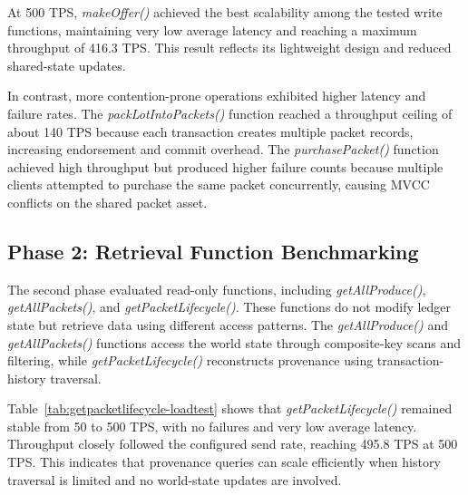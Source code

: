 \documentclass[manuscript,screen]{acmart}
\begin{document}
At 500 TPS, \textit{makeOffer()} achieved the best scalability among the tested write functions, maintaining very low average latency and reaching a maximum throughput of 416.3 TPS. This result reflects its lightweight design and reduced shared-state updates.

In contrast, more contention-prone operations exhibited higher latency and failure rates. The \textit{packLotIntoPackets()} function reached a throughput ceiling of about 140 TPS because each transaction creates multiple packet records, increasing endorsement and commit overhead. The \textit{purchasePacket()} function achieved high throughput but produced higher failure counts because multiple clients attempted to purchase the same packet concurrently, causing MVCC conflicts on the shared packet asset.

\subsection{Phase 2: Retrieval Function Benchmarking}

The second phase evaluated read-only functions, including \textit{getAllProduce()}, \textit{getAllPackets()}, and \textit{getPacketLifecycle()}. These functions do not modify ledger state but retrieve data using different access patterns. The \textit{getAllProduce()} and \textit{getAllPackets()} functions access the world state through composite-key scans and filtering, while \textit{getPacketLifecycle()} reconstructs provenance using transaction-history traversal.

Table~\ref{tab:getpacketlifecycle-loadtest} shows that \textit{getPacketLifecycle()} remained stable from 50 to 500 TPS, with no failures and very low average latency. Throughput closely followed the configured send rate, reaching 495.8 TPS at 500 TPS. This indicates that provenance queries can scale efficiently when history traversal is limited and no world-state updates are involved.
\end{document}
